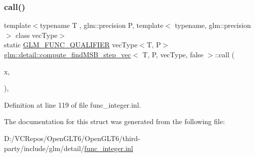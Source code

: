 \subsubsection{\texorpdfstring{call()}{call()}}
{\footnotesize\ttfamily template$<$typename T , glm\+::precision P, template$<$ typename, glm\+::precision $>$ class vec\+Type$>$ \\
static \mbox{\hyperlink{setup_8hpp_a33fdea6f91c5f834105f7415e2a64407}{G\+L\+M\+\_\+\+F\+U\+N\+C\+\_\+\+Q\+U\+A\+L\+I\+F\+I\+ER}} vec\+Type$<$T, P$>$ \mbox{\hyperlink{structglm_1_1detail_1_1compute__find_m_s_b__step__vec}{glm\+::detail\+::compute\+\_\+find\+M\+S\+B\+\_\+step\+\_\+vec}}$<$ T, P, vec\+Type, false $>$\+::call (\begin{DoxyParamCaption}\item[{vec\+Type$<$ T, P $>$ const \&}]{x,  }\item[{T}]{ }\end{DoxyParamCaption})\hspace{0.3cm}{\ttfamily [inline]}, {\ttfamily [static]}}



Definition at line 119 of file func\+\_\+integer.\+inl.



The documentation for this struct was generated from the following file\+:\begin{DoxyCompactItemize}
\item 
D\+:/\+V\+C\+Repos/\+Open\+G\+L\+T6/\+Open\+G\+L\+T6/third-\/party/include/glm/detail/\mbox{\hyperlink{func__integer_8inl}{func\+\_\+integer.\+inl}}\end{DoxyCompactItemize}
